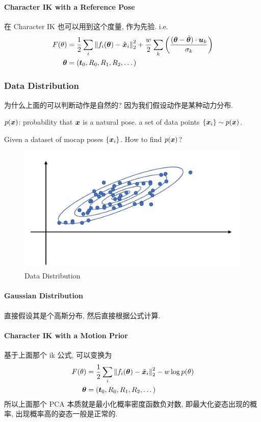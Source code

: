 \paragraph{Character IK with a Reference Pose}在 Character IK 也可以用到这个度量, 作为先验. i.e.
\begin{align*}
    F(\theta)&=\frac{1}{2}\sum_i\left\lVert f_i({\bm{\theta}})-\tilde{{\bm{x}}}_i\right\rVert_2^2 + \frac{w}{2}\sum_k\left( \frac{({\bm{\theta}}-\bar{{\bm{\theta}}})\cdot\bm{u}_k}{\sigma_k} \right)\\
    {\bm{\theta}}&=(\bm{t}_0, R_0, R_1, R_2, \dots)
\end{align*}

\subsubsection{Data Distribution}
为什么上面的可以判断动作是自然的? 因为我们假设动作是某种动力分布. 

$p({\bm{x}})$: probability that ${\bm{x}}$ is a natural pose. a set of data points $\{{\bm{x}}_i\}\sim p({\bm{x}})$.

Given a dataset of mocap poses $\{{\bm{x}}_i\}$. How to find $p({\bm{x}})$?

\begin{figure}[!htb]
    \centering
    \includegraphics[width=0.618\linewidth]{pic/1056/Data Distribution}
    \caption{Data Distribution}
\end{figure}

\paragraph{Gaussian Distribution}直接假设其是个高斯分布, 然后直接根据公式计算. 

\paragraph{Character IK with a Motion Prior}基于上面那个 ik 公式, 可以变换为
\begin{align*}
    F(\theta)&=\frac{1}{2}\sum_i\left\lVert f_i({\bm{\theta}})-\tilde{{\bm{x}}}_i\right\rVert_2^2 -w\log p(\theta)\\
    {\bm{\theta}}&=(\bm{t}_0, R_0, R_1, R_2, \dots)
\end{align*}
所以上面那个 PCA 本质就是最小化概率密度函数负对数, 即最大化姿态出现的概率, 出现概率高的姿态一般是正常的. 

